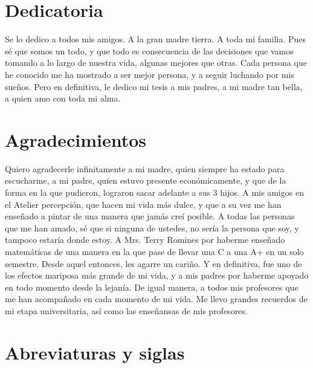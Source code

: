 \documentclass[12pt,letterpaper]{article}
\begin{document}
\newpage

\clearpage
{}
{}
\section*{Dedicatoria}
Se lo dedico a todos mis amigos. A la gran madre tierra. A toda mi familia. Pues sé que somos un todo, y que todo es consecuencia de las decisiones que vamos tomando a lo largo de nuestra vida, algunas mejores que otras. Cada persona que he conocido me ha mostrado a ser mejor persona, y a seguir luchando por mis sueños. Pero en definitiva, le dedico mi tesis a mis padres, a mi madre tan bella, a quien amo con toda mi alma.

\newpage



\clearpage
{}
{}
\section*{Agradecimientos}
Quiero agradecerle infinitamente a mi madre, quien siempre ha estado para escucharme, a mi padre, quien estuvo presente económicamente, y que de la forma en la que pudieron, lograron sacar adelante a sus 3 hijos. 
A mis amigos en el Atelier percepción, que hacen mi vida más dulce, y que a su vez me han enseñado a pintar de una manera que jamás creí posible. 
A todas las personas que me han amado, sé que si ninguna de ustedes, no sería la persona que soy, y tampoco estaría donde estoy.
A Mrs. Terry Romines por haberme enseñado matemáticas de una manera en la que pase de llevar una C a una A+ en un solo semestre. Desde aquel entonces, les agarre un cariño. Y en definitiva, fue uno de los efectos mariposa más grande de mi vida, y a mis padres por haberme apoyado en todo momento desde la lejanía. 
De igual manera, a todos mis profesores que me han acompañado en cada momento de mi vida. Me llevo grandes recuerdos de mi etapa universitaria, así como las enseñansas de mis profesores. 

\newpage

\clearpage
{}
{}
\section*{Abreviaturas y siglas}
\end{document}
